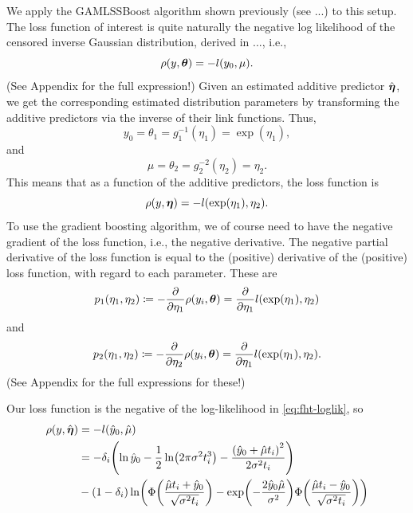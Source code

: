 We apply the GAMLSSBoost algorithm shown previously (see ...) to this setup. The loss function of interest is quite
naturally the negative log likelihood of the censored inverse Gaussian distribution, derived in ..., i.e.,
\begin{equation*}
    \rho(y,\boldsymbol{\theta})=-l(y_0, \mu).
\end{equation*}
(See Appendix for the full expression!)
Given an estimated additive predictor $\hat{\boldsymbol{\eta}}$, we get the corresponding estimated distribution parameters by
transforming the additive predictors via the inverse of their link functions. Thus,
\begin{equation}
    y_0=\theta_1=g_1^{-1}(\eta_1)=\exp(\eta_1),
\end{equation}
and
\begin{equation}
    \mu=\theta_2=g_2^{-2}(\eta_2)=\eta_2.
\end{equation}
This means that as a function of the additive predictors, the loss function is
\begin{equation*}
    \rho(y,\boldsymbol{\eta})=-l(\exp(\eta_1), \eta_2).
\end{equation*}
To use the gradient boosting algorithm, we of course need to have the negative gradient of the loss function, i.e.,
the negative derivative. The negative partial derivative of the loss function is equal to the (positive) derivative of the (positive) loss 
function, with regard to each parameter. These are
\begin{equation}
    p_1(\eta_1,\eta_2)\coloneqq-\frac{\partial}{\partial\eta_1}\rho(y_i,\boldsymbol{\theta})=\frac{\partial}{\partial\eta_1}l(\exp(\eta_1), \eta_2)
\end{equation}
and
\begin{equation}
    p_2(\eta_1,\eta_2)\coloneqq-\frac{\partial}{\partial\eta_2}\rho(y_i,\boldsymbol{\theta})=\frac{\partial}{\partial\eta_1}l(\exp(\eta_1), \eta_2).
\end{equation}
(See Appendix for the full expressions for these!)




Our loss function is the negative of the log-likelihood in \eqref{eq:fht-loglik}, so
\begin{align}\label{eq:fht-loglik}
\begin{split}
    \rho(y,\hat{\boldeta})&=-l(\hat{y}_0, \hat{\mu}) \\
    &=-\di\p*{\ln \hat{y}_0-\frac{1}{2}\ln\p*{2\pi\sigma^2\ti^3}-\frac{\p*{\hat{y}_0+\hat{\mu}\ti}^2}{2\sigma^2\ti}} \\
    &-
    (1-\di)\ln\p*{\Phi\p*{\frac{\hat{\mu}\ti+\hat{y}_0}{\sqrt{\sigma^2\ti}}}-\exp\p*{-\frac{2\hat{y}_0\hat{\mu}}{\sigma^2}}\Phi\p*{\frac{\hat{\mu}\ti-\hat{y}_0}{\sqrt{\sigma^2\ti}}}}
\end{split}
\end{align}


